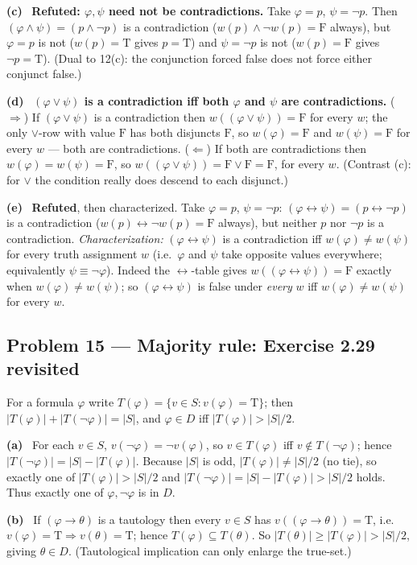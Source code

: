 \documentclass[11pt]{article}
\newcommand{\T}{\mathrm{T}}
\newcommand{\F}{\mathrm{F}}
\newcommand{\solpart}[1]{\smallskip\noindent\textbf{(#1)}\ }
\newcommand{\prob}[2]{\subsection*{Problem #1 --- #2}}
\begin{document}
\solpart{c} \textbf{Refuted: $\varphi,\psi$ need not be contradictions.} Take
$\varphi=p$, $\psi=\lnot p$. Then $(\varphi\land\psi)=(p\land\lnot p)$ is a
contradiction ($w(p)\land\lnot w(p)=\F$ always), but $\varphi=p$ is not ($w(p)=\T$
gives $p=\T$) and $\psi=\lnot p$ is not ($w(p)=\F$ gives $\lnot p=\T$). (Dual to
12(c): the conjunction forced false does not force either conjunct false.)

\solpart{d} \textbf{$(\varphi\lor\psi)$ is a contradiction iff both $\varphi$ and
$\psi$ are contradictions.}
($\Rightarrow$) If $(\varphi\lor\psi)$ is a contradiction then $w((\varphi\lor\psi))
=\F$ for every $w$; the only $\lor$-row with value $\F$ has both disjuncts $\F$, so
$w(\varphi)=\F$ and $w(\psi)=\F$ for every $w$ --- both are contradictions.
($\Leftarrow$) If both are contradictions then $w(\varphi)=w(\psi)=\F$, so
$w((\varphi\lor\psi))=\F\lor\F=\F$, for every $w$. (Contrast (c): for $\lor$ the
condition really does descend to each disjunct.)

\solpart{e} \textbf{Refuted}, then characterized. Take $\varphi=p$, $\psi=\lnot p$:
$(\varphi\leftrightarrow\psi)=(p\leftrightarrow\lnot p)$ is a contradiction ($w(p)
\leftrightarrow\lnot w(p)=\F$ always), but neither $p$ nor $\lnot p$ is a
contradiction. \emph{Characterization:} $(\varphi\leftrightarrow\psi)$ is a
contradiction iff $w(\varphi)\neq w(\psi)$ for every truth assignment $w$ (i.e.\
$\varphi$ and $\psi$ take opposite values everywhere; equivalently $\psi\equiv
\lnot\varphi$). Indeed the $\leftrightarrow$-table gives $w((\varphi\leftrightarrow
\psi))=\F$ exactly when $w(\varphi)\neq w(\psi)$; so $(\varphi\leftrightarrow\psi)$
is false under \emph{every} $w$ iff $w(\varphi)\neq w(\psi)$ for every $w$.

\prob{15}{Majority rule: Exercise 2.29 revisited}

For a formula $\varphi$ write $T(\varphi)=\{v\in S:v(\varphi)=\T\}$; then
$|T(\varphi)|+|T(\lnot\varphi)|=|S|$, and $\varphi\in D$ iff $|T(\varphi)|>|S|/2$.

\solpart{a} For each $v\in S$, $v(\lnot\varphi)=\lnot v(\varphi)$, so $v\in
T(\varphi)$ iff $v\notin T(\lnot\varphi)$; hence $|T(\lnot\varphi)|=|S|-|T(\varphi)|$.
Because $|S|$ is odd, $|T(\varphi)|\neq|S|/2$ (no tie), so exactly one of
$|T(\varphi)|>|S|/2$ and $|T(\lnot\varphi)|=|S|-|T(\varphi)|>|S|/2$ holds. Thus
exactly one of $\varphi,\lnot\varphi$ is in $D$.

\solpart{b} If $(\varphi\to\theta)$ is a tautology then every $v\in S$ has
$v((\varphi\to\theta))=\T$, i.e.\ $v(\varphi)=\T\Rightarrow v(\theta)=\T$; hence
$T(\varphi)\subseteq T(\theta)$. So $|T(\theta)|\ge|T(\varphi)|>|S|/2$, giving
$\theta\in D$. (Tautological implication can only enlarge the true-set.)
\end{document}
